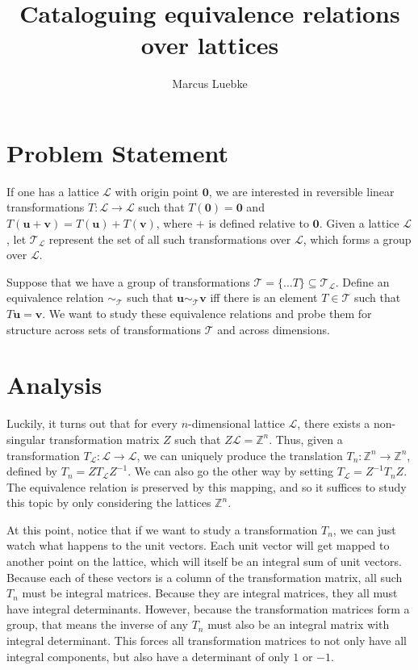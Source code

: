 \documentclass{article}
\title{Cataloguing equivalence relations over lattices}
\author{Marcus Luebke}
\def\u{\textbf{u}}
\def\v{\textbf{v}}
\def\0{\textbf{0}}
\def\Z{\mathbb{Z}}
\def\L{\mathcal{L}}
\def\T{\mathcal{T}}
\begin{document}
\maketitle

\section{Problem Statement}
\fontsize{10pt}{15pt}\selectfont
If one has a lattice $\L$ with origin point $\0$, we are interested in reversible linear transformations $T:\L\to\L$ such that $T(\0)=\0$ and $T(\u+\v)=T(\u)+T(\v)$, where $+$ is defined relative to $\0$. Given a lattice $\L$, let $\T_\L$ represent the set of all such transformations over $\L$, which forms a group over $\L$.

Suppose that we have a group of transformations $\T=\{\ldots T\}\subseteq\T_\L$. Define an equivalence relation $\sim_\T$ such that $\u\sim_\T \v$ iff there is an element $T\in\T$ such that $T\u = \v$. We want to study these equivalence relations and probe them for structure across sets of transformations $\T$ and across dimensions.

\section{Analysis}
Luckily, it turns out that for every $n$-dimensional lattice $\L$, there exists a non-singular transformation matrix $Z$ such that $Z\L=\Z^n$. Thus, given a transformation $T_\L:\L\to\L$, we can uniquely produce the translation $T_n:\Z^n\to\Z^n$, defined by $T_n=ZT_\L Z^{-1}$. We can also go the other way by setting $T_\L=Z^{-1}T_nZ$. The equivalence relation is preserved by this mapping, and so it suffices to study this topic by only considering the lattices $\Z^n$.

At this point, notice that if we want to study a transformation $T_n$, we can just watch what happens to the unit vectors. Each unit vector will get mapped to another point on the lattice, which will itself be an integral sum of unit vectors. Because each of these vectors is a column of the transformation matrix, all such $T_n$ must be integral matrices. Because they are integral matrices, they all must have integral determinants. However, because the transformation matrices form a group, that means the inverse of any $T_n$ must also be an integral matrix with integral determinant. This forces all transformation matrices to not only have all integral components, but also have a determinant of only $1$ or $-1$.
\end{document}
